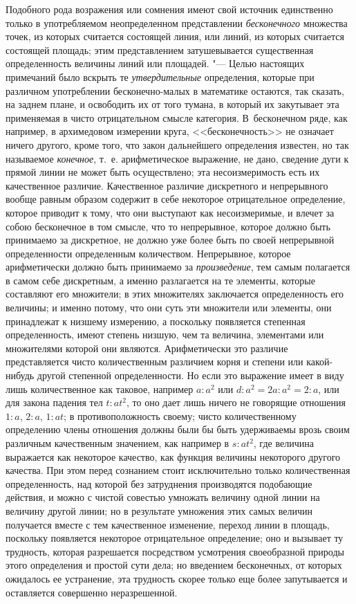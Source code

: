 Подобного рода возражения или сомнения имеют свой источник единственно
только в употребляемом неопределенном представлении
{\em бесконечного} множества точек, из которых
считается состоящей линия, или линий, из которых считается состоящей
площадь; этим представлением затушевывается существенная определенность
величины линий или площадей. "--- Целью настоящих примечаний было вскрыть те
{\em утвердительные} определения, которые при различном
употреблении бесконечно-малых в математике остаются, так сказать, на заднем
плане, и освободить их от того тумана, в который их закутывает эта
применяемая в чисто отрицательном смысле категория. В~бесконечном ряде, как
например, в архимедовом измерении круга, <<бесконечность>> не означает ничего
другого, кроме того, что закон дальнейшего определения известен, но так
называемое {\em конечное}, т.~е. арифметическое
выражение, не дано, сведение дуги к прямой линии не может быть
осуществлено; эта несоизмеримость есть их качественное различие.
Качественное различие дискретного и непрерывного вообще равным образом
содержит в себе некоторое отрицательное определение, которое приводит к
тому, что они выступают как несоизмеримые, и влечет за собою бесконечное в
том смысле, что то непрерывное, которое должно быть принимаемо за
дискретное, не должно уже более быть по своей непрерывной определенности
определенным количеством. Непрерывное, которое арифметически должно быть
принимаемо за {\em произведение}, тем самым полагается
в самом себе дискретным, а именно разлагается на те элементы, которые
составляют его множители; в этих множителях заключается определенность его
величины; и именно потому, что они суть эти множители или элементы, они
принадлежат к низшему измерению, а поскольку появляется степенная
определенность, имеют степень низшую, чем та величина, элементами или
множителями которой они являются. Арифметически это различие представляется
чисто количественным различием корня и степени или какой-нибудь другой
степенной определенности. Но если это выражение имеет в виду лишь
количественное как таковое, например $a : a^2$ или
$d : a^2 = 2a : a^2 = 2 : a$, или для закона падения тел 
$t : at^2$, то оно дает лишь ничего не говорящие отношения 
$1 : a$, $2:a$, $1 : at$; в противоположность своему; чисто
количественному определению члены отношения должны были бы быть удерживаемы
врозь своим различным качественным значением, как например в 
$s : at^2$, где величина выражается как некоторое качество,
как функция величины некоторого другого качества. При этом перед сознанием
стоит исключительно только количественная определенность, над которой без
затруднения производятся подобающие действия, и можно с чистой совестью
умножать величину одной линии на величину другой линии; но в результате
умножения этих самых величин получается вместе с тем качественное
изменение, переход линии в площадь, поскольку появляется некоторое
отрицательное определение; оно и вызывает ту трудность, которая разрешается
посредством усмотрения своеобразной природы этого определения и простой
сути дела; но введением бесконечных, от которых ожидалось ее устранение,
эта трудность скорее только еще более запутывается и оставляется совершенно
неразрешенной.

